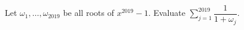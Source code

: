 Let $\omega_1,\ldots,\omega_{2019}$ be all roots of $x^{2019}-1$. Evaluate $\sum_{j=1}^{2019}\dfrac{1}{1+\omega_j}$.
